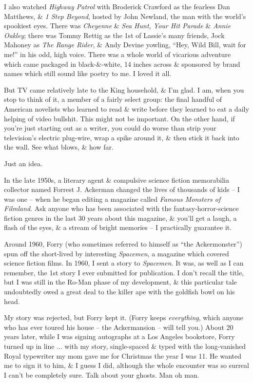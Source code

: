 \documentclass{article}
\numberwithin{equation}{section}
\begin{document}
I also watched \textit{Highway Patrol} with Broderick Crawford as the fearless Dan Matthews, \& \textit{1 Step Beyond}, hosted by John Newland, the man with the world's spookiest eyes. There was \textit{Cheyenne} \& \textit{Sea Hunt, Your Hit Parade} \& \textit{Annie Oakley}; there was Tommy Rettig as the 1st of Lassie's many friends, Jock Mahoney as \textit{The Range Rider}, \& Andy Devine yowling, ``Hey, Wild Bill, wait for me!'' in his odd, high voice. There was a whole world of vicarious adventure which came packaged in black-\&-white, 14 inches across \& sponsored by brand names which still sound like poetry to me. I loved it all.

But TV came relatively late to the King household, \& I'm glad. I am, when you stop to think of it, a member of a fairly select group: the final handful of American novelists who learned to read \& write before they learned to eat a daily helping of video bullshit. This might not be important. On the other hand, if you're just starting out as a writer, you could do worse than strip your television's electric plug-wire, wrap a spike around it, \& then stick it back into the wall. See what blows, \& how far.

Just an idea.

 In the late 1950s, a literary agent \& compulsive science fiction memorabilia collector named Forrest J. Ackerman changed the lives of thousands of kids -- I was one -- when he began editing a magazine called \textit{Famous Monsters of Filmland}. Ask anyone who has been associated with the fantasy-horror-science fiction genres in the last 30 years about this magazine, \& you'll get a laugh, a flash of the eyes, \& a stream of bright memories -- I practically guarantee it.

Around 1960, Forry (who sometimes referred to himself as ``the Ackermonster'') spun off the short-lived by interesting \textit{Spacemen}, a magazine which covered science fiction films. In 1960, I sent a story to \textit{Spacemen}. It was, as well as I can remember, the 1st story I ever submitted for publication. I don't recall the title, but I was still in the Ro-Man phase of my development, \& this particular tale undoubtedly owed a great deal to the killer ape with the goldfish bowl on his head.

My story was rejected, but Forry kept it. (Forry keeps \textit{everything}, which anyone who has ever toured his house -- the Ackermansion -- will tell you.) About 20 years later, while I was signing autographs at a Los Angeles bookstore, Forry turned up in line $\ldots$ with my story, single-spaced \& typed with the long-vanished Royal typewriter my mom gave me for Christmas the year I was 11. He wanted me to sign it to him, \& I guess I did, although the whole encounter was so surreal I can't be completely sure. Talk about your ghosts. Man oh man.
\end{document}
